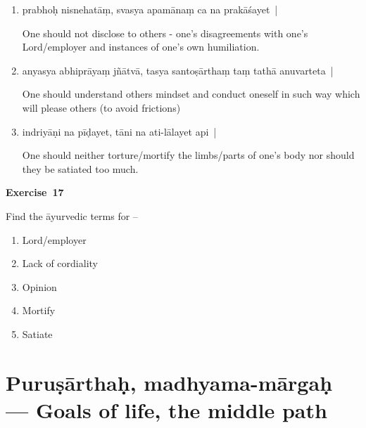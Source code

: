 \begin{enumerate}
\itemsep=0pt
\item {}

prabhoḥ nisnehatāṃ, svasya apamānaṃ ca na prakāśayet~| 

One should not disclose to others - one's disagreements with one's Lord/employer and instances of one's own humiliation.

\item {}

anyasya abhiprāyaṃ jñātvā, tasya santoṣārthaṃ taṃ tathā anuvarteta~|

One should understand others mindset and conduct oneself in such way which will please others (to avoid frictions) 

\item {}

indriyāṇi na pīḍayet, tāni na ati-lālayet api~| 

One should neither torture/mortify the limbs/parts of one’s body nor should they be satiated too much.
\end{enumerate}

\centerline{\textbf{Exercise~17}}

Find the āyurvedic terms for –
\begin{enumerate}
\itemsep=0pt
\renewcommand{\theenumi}{\alph{enumi}}
\renewcommand{\labelenumi}{\theenumi.}
\item Lord/employer
\item Lack of cordiality
\item Opinion
\item Mortify
\item Satiate
\end{enumerate}

\chapter{Puruṣārthaḥ, madhyama-mārgaḥ --- Goals of life, the middle path}

